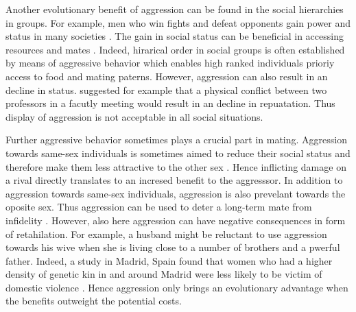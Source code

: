 Another evolutionary benefit of aggression can be found in the  social hierarchies in groups.
For example, men who win fights and defeat opponents gain power and status in many societies \cite{Hill1996}.
The gain in social status can be beneficial in accessing resources and mates \cite{Archer2009}.
Indeed, hirarical order in social groups is often established by means of aggressive behavior which enables high ranked individuals prioriy access to food and mating paterns\cite{Lindenfors2011}. 
However, aggression can also result in an decline in status.
\citet{Buss1997} suggested for example that a physical conflict between two professors in a facutly meeting would result in an decline in repuatation.
Thus display of aggression is not acceptable in all social situations.

Further aggressive behavior sometimes plays a crucial part in mating.
Aggression towards same-sex individuals is sometimes aimed to reduce their social status and therefore make them less attractive to the other sex \cite{Buss1990}.
Hence inflicting damage on a rival directly translates to an incresed benefit to the aggresssor.
In addition to aggression towards same-sex individuals, aggression is also prevelant towards the oposite sex.
Thus aggression can be used to deter a long-term mate from infidelity \cite{Daly1982}.
However, also here aggression can have negative consequences in form of retahilation.
For example, a husband might be reluctant to use aggression towards his wive when she is living close to a number of brothers and a pwerful father.
Indeed, a study in Madrid, Spain found that women who had a higher density of genetic kin in and around Madrid were less likely to be victim of domestic violence \cite{Figueredo1995}.
Hence aggression only brings an evolutionary advantage when the benefits outweight the potential costs.

